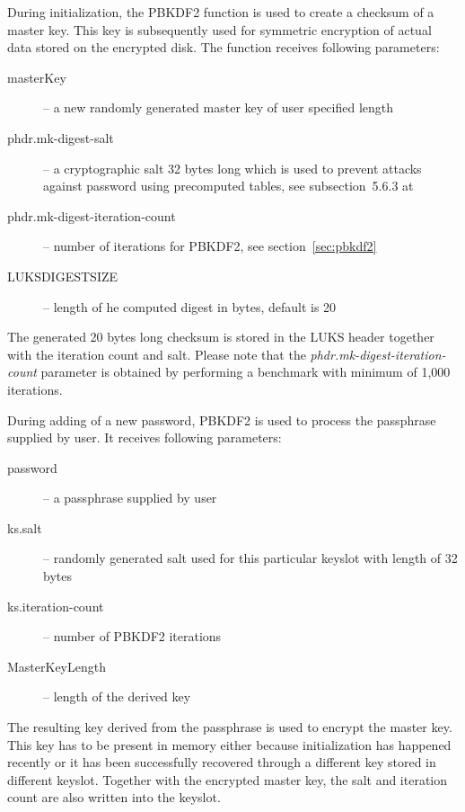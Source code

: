 \documentclass[nolof]{fithesis3}
\begin{document}
During initialization, the PBKDF2 function is used to create a checksum of a master key. This key is subsequently used for symmetric encryption of actual data stored on the encrypted disk. The function receives following parameters:

\begin{description}
\item[masterKey] -- a new randomly generated master key of user specified length

\item[phdr.mk-digest-salt] -- a cryptographic salt 32 bytes long which is used to prevent attacks against password using precomputed tables, see subsection~5.6.3 at \parencite{itmc14}

\item[phdr.mk-digest-iteration-count] -- number of iterations for PBKDF2, see section~\ref{sec:pbkdf2}

\item[LUKS\-DIGEST\-SIZE] -- length of he computed digest in bytes, default is 20
\end{description}

The generated 20 bytes long checksum is stored in the LUKS header together with the iteration count and salt. Please note that the \emph{phdr.mk-digest-iteration-count} parameter is obtained by performing a benchmark with minimum of 1,000 iterations.

During adding of a new password, PBKDF2 is used to process the passphrase supplied by user. It receives following parameters:

\begin{description}
\item[password] -- a passphrase supplied by user

\item[ks.salt] -- randomly generated salt used for this particular keyslot with length of 32 bytes

\item[ks.iteration-count] -- number of PBKDF2 iterations

\item[MasterKeyLength] -- length of the derived key
\end{description}

The resulting key derived from the passphrase is used to encrypt the master key. This key has to be present in memory either because initialization has happened recently or it has been successfully recovered through a different key stored in different keyslot. Together with the encrypted master key, the salt and iteration count are also written into the keyslot.
\end{document}
